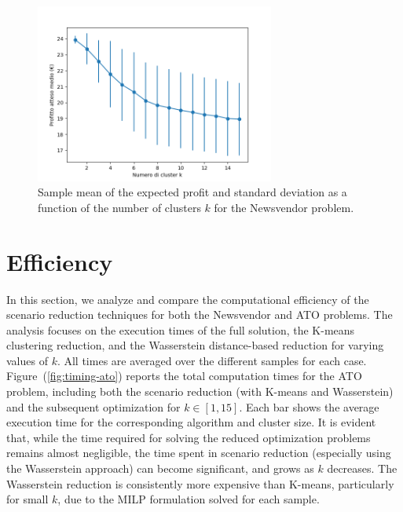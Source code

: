\documentclass[a4paper,12pt]{article}
\begin{document}
	\begin{figure}[H]
		\centering
		\includegraphics[width=0.7\textwidth]{../immagini/rendimentoWass_ato.png}
		\caption{Sample mean of the expected profit and standard deviation as a function of the number of clusters $k$ for the Newsvendor problem.}
		\label{fig:rendimentoWass-ato}
	\end{figure}
	
	\newpage	
	\section{Efficiency}
	
	In this section, we analyze and compare the computational efficiency of the scenario reduction techniques for both the Newsvendor and ATO problems. The analysis focuses on the execution times of the full solution, the K-means clustering reduction, and the Wasserstein distance-based reduction for varying values of $k$. All times are averaged over the different samples for each case.\\
	
	\noindent Figure~(\ref{fig:timing-ato}) reports the total computation times for the ATO problem, including both the scenario reduction (with K-means and Wasserstein) and the subsequent optimization for $k \in [1,15]$. Each bar shows the average execution time for the corresponding algorithm and cluster size. It is evident that, while the time required for solving the reduced optimization problems remains almost negligible, the time spent in scenario reduction (especially using the Wasserstein approach) can become significant, and grows as $k$ decreases. The Wasserstein reduction is consistently more expensive than K-means, particularly for small $k$, due to the MILP formulation solved for each sample.
	
\end{document}
